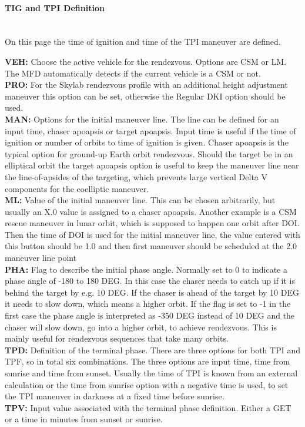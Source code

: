 \documentclass[11pt]{article} %
\begin{document}
\paragraph{TIG and TPI Definition}\mbox{} \\

On this page the time of ignition and time of the TPI maneuver are defined.

\textbf{VEH:} Choose the active vehicle for the rendezvous. Options are CSM or LM. The MFD automatically detects if the current vehicle is a CSM or not.\\
\textbf{PRO:} For the Skylab rendezvous profile with an additional height adjustment maneuver this option can be set, otherwise the Regular DKI option should be used.\\
\textbf{MAN:} Options for the initial maneuver line. The line can be defined for an input time, chaser apoapsis or target apoapsis. Input time is useful if the time of ignition or number of orbits to time of ignition is given. Chaser apoapsis is the typical option for ground-up Earth orbit rendezvous. Should the target be in an elliptical orbit the target apoapsis option is useful to keep the maneuver line near the line-of-apsides of the targeting, which prevents large vertical Delta V components for the coelliptic maneuver.\\
\textbf{ML:} Value of the initial maneuver line. This can be chosen arbitrarily, but usually an X.0 value is assigned to a chaser apoapsis. Another example is a CSM rescue maneuver in lunar orbit, which is supposed to happen one orbit after DOI. Then the time of DOI is used for the initial maneuver line, the value entered with this button should be 1.0 and then first maneuver should be scheduled at the 2.0 maneuver line point\\
\textbf{PHA:} Flag to describe the initial phase angle. Normally set to 0 to indicate a phase angle of -180 to 180 DEG. In this case the chaser needs to catch up if it is behind the target by e.g. 10 DEG. If the chaser is ahead of the target by 10 DEG it needs to slow down, which means a higher orbit. If the flag is set to -1 in the first case the phase angle is interpreted as -350 DEG instead of 10 DEG and the chaser will slow down, go into a higher orbit, to achieve rendezvous. This is mainly useful for rendezvous sequences that take many orbits.\\

\textbf{TPD:} Definition of the terminal phase. There are three options for both TPI and TPF, so in total six combinations. The three options are input time, time from sunrise and time from sunset. Usually the time of TPI is known from an external calculation or the time from sunrise option with a negative time is used, to set the TPI maneuver in darkness at a fixed time before sunrise.\\
\textbf{TPV:} Input value associated with the terminal phase definition. Either a GET or a time in minutes from sunset or sunrise.\\
\end{document}
